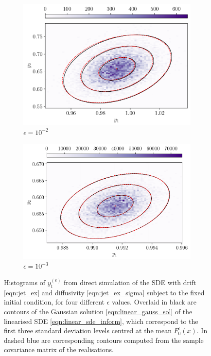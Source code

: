 \begin{figure}
\begin{center}
\begin{subfigure}{0.49\textwidth}
			\includegraphics[width=\textwidth]{chp04_paper_numerics/figures/rossby/hist_0.010000000000000002.pdf}
			\caption{\(\epsilon = 10^{-2}\)}
			\label{fig:y_hists_c}
		\end{subfigure}
		\begin{subfigure}{0.49\textwidth}
			\includegraphics[width=\textwidth]{chp04_paper_numerics/figures/rossby/hist_0.001.pdf}
			\caption{\(\epsilon = 10^{-3}\)}
			\label{fig:y_hists_d}
		\end{subfigure}
		\caption{Histograms of \(y_t^{(\epsilon)}\) from direct simulation of the SDE with drift \cref{eqn:jet_ex} and diffusivity \cref{eqn:jet_ex_sigma} subject to the fixed initial condition, for four different \(\epsilon\) values.
		Overlaid in black are contours of the Gaussian solution \cref{eqn:linear_gauss_sol} of the linearised SDE \cref{eqn:linear_sde_inform}, which correspond to the first three standard deviation levels centred at the mean \(F_0^t(x)\).
		In dashed blue are corresponding contours computed from the sample covariance matrix of the realisations.
		}
		\label{fig:y_hists}
	\end{center}
\end{figure}


